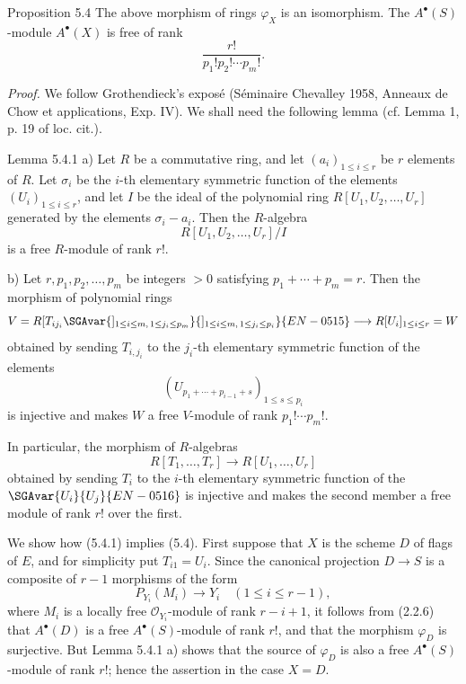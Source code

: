 \begin{statement}{Proposition 5.4}
The above morphism of rings $\varphi_X$ is an isomorphism. The $A^{\bullet}(S)$-module $A^{\bullet}(X)$ is free of rank
\[
\frac{r!}{p_1!p_2!\cdots p_m!}.
\]
\end{statement}

\emph{Proof.} We follow Grothendieck's exposé (Séminaire Chevalley 1958, Anneaux de Chow et applications, Exp. IV). We shall need the following lemma (cf. Lemma 1, p. 19 of loc. cit.).

\begin{statement}{Lemma 5.4.1}
a) Let $R$ be a commutative ring, and let $(a_i)_{1\le i\le r}$ be $r$ elements of $R$. Let $\sigma_i$ be the $i$-th elementary symmetric function of the elements $(U_i)_{1\le i\le r}$, and let $I$ be the ideal of the polynomial ring $R[U_1,U_2,\ldots,U_r]$ generated by the elements $\sigma_i-a_i$. Then the $R$-algebra
\[
R[U_1,U_2,\ldots,U_r]/I
\]
is a free $R$-module of rank $r!$.

b) Let $r,p_1,p_2,\ldots,p_m$ be integers $>0$ satisfying $p_1+\cdots+p_m=r$. Then the morphism of polynomial rings
\[
V=R[T_{ij_i}\SGAvar{]_{1\le i\le m,\,1\le j_i\le p_m}}{]_{1\le i\le m,\,1\le j_i\le p_i}}{EN-0515}
\longrightarrow R[U_i]_{1\le i\le r}=W
\]
obtained by sending $T_{i,j_i}$ to the $j_i$-th elementary symmetric function of the elements
\[
(U_{p_1+\cdots+p_{i-1}+s})_{1\le s\le p_i}
\]
is injective and makes $W$ a free $V$-module of rank $p_1!\cdots p_m!$.

In particular, the morphism of $R$-algebras
\[
R[T_1,\ldots,T_r]\to R[U_1,\ldots,U_r]
\]
obtained by sending $T_i$ to the $i$-th elementary symmetric function of the $\SGAvar{U_i}{U_j}{EN-0516}$ is injective and makes the second member a free module of rank $r!$ over the first.
\end{statement}

We show how (5.4.1) implies (5.4). First suppose that $X$ is the scheme $D$ of flags of $E$, and for simplicity put $T_{i1}=U_i$. Since the canonical projection $D\to S$ is a composite of $r-1$ morphisms of the form
\[
P_{Y_i}(M_i)\to Y_i\quad(1\le i\le r-1),
\]
where $M_i$ is a locally free $\mathcal O_{Y_i}$-module of rank $r-i+1$, it follows from (2.2.6) that $A^{\bullet}(D)$ is a free $A^{\bullet}(S)$-module of rank $r!$, and that the morphism $\varphi_D$ is surjective. But Lemma 5.4.1 a) shows that the source of $\varphi_D$ is also a free $A^{\bullet}(S)$-module of rank $r!$; hence the assertion in the case $X=D$.

